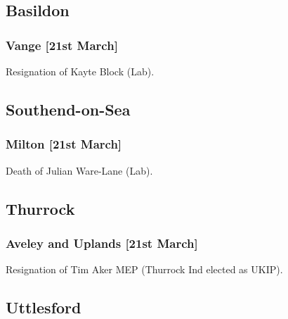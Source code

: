 \documentclass[a4paper,openany]{book}
\begin{document}
\begin{resultsiii}
\subsection*{Basildon}

\subsubsection*{Vange \hspace*{\fill}\nolinebreak[1]%
	\enspace\hspace*{\fill}
	[21st March]}


Resignation of Kayte Block (Lab).

\subsection*{Southend-on-Sea}

\subsubsection*{Milton \hspace*{\fill}\nolinebreak[1]%
	\enspace\hspace*{\fill}
	[21st March]}


Death of Julian Ware-Lane (Lab).

\subsection*{Thurrock}

\subsubsection*{Aveley and Uplands \hspace*{\fill}\nolinebreak[1]%
	\enspace\hspace*{\fill}
	[21st March]}


Resignation of Tim Aker MEP (Thurrock Ind elected as UKIP).

\subsection*{Uttlesford}


\end{resultsiii}
\end{document}
